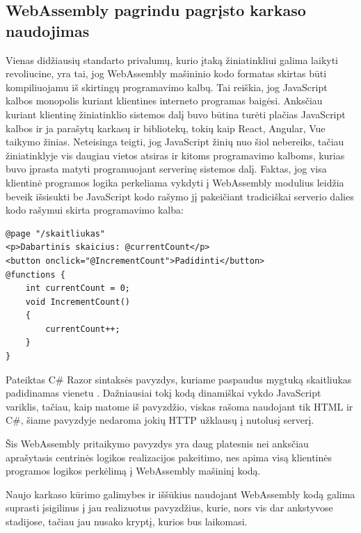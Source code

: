 \documentclass{VUMIFPSkursinis}
\begin{document}
\subsection{WebAssembly pagrindu pagrįsto karkaso naudojimas}
Vienas didžiausių standarto privalumų, kurio įtaką žiniatinkliui galima laikyti revoliucine, yra tai, jog WebAssembly mašininio kodo formatas skirtas būti kompiliuojamu iš skirtingų programavimo kalbų. Tai reiškia, jog JavaScript kalbos monopolis kuriant klientines interneto programas baigėsi. Anksčiau kuriant klientinę žiniatinklio sistemos dalį buvo būtina turėti plačias JavaScript kalbos ir ja parašytų karkasų ir bibliotekų, tokių kaip React, Angular, Vue taikymo žinias. Neteisinga teigti, jog JavaScript žinių nuo šiol nebereiks, tačiau žiniatinklyje vis daugiau vietos atsiras ir kitoms programavimo kalboms, kurias buvo įprasta matyti programuojant serverinę sistemos dalį. Faktas, jog visa klientinė programos logika perkeliama vykdyti į WebAssembly modulius leidžia beveik išsisukti be JavaScript kodo rašymo jį pakeičiant tradiciškai serverio dalies kodo rašymui skirta programavimo kalba:

\begin{center}
\begin{small}
\begin{verbatim}
@page "/skaitliukas"
<p>Dabartinis skaicius: @currentCount</p>
<button onclick="@IncrementCount">Padidinti</button>
@functions {
    int currentCount = 0;
    void IncrementCount()
    {
        currentCount++;
    }
}
\end{verbatim}
\end{small}
\end{center}Pateiktas C\# Razor sintaksės pavyzdys, kuriame paspaudus mygtuką skaitliukas padidinamas vienetu \cite{BLZ19}. Dažniausiai tokį kodą dinamiškai vykdo JavaScript variklis, tačiau, kaip matome iš pavyzdžio, viskas rašoma naudojant tik HTML ir C\#, šiame pavyzdyje nedaroma jokių HTTP užklausų į nutolusį serverį.

Šis WebAssembly pritaikymo pavyzdys yra daug platesnis nei anksčiau aprašytasis centrinės logikos realizacijos pakeitimo, nes apima visą klientinės programos logikos perkėlimą į WebAssembly mašininį kodą.

Naujo karkaso kūrimo galimybes ir iššūkius naudojant WebAssembly kodą galima suprasti įsigilinus į jau realizuotus pavyzdžius, kurie, nors vis dar ankstyvose stadijose, tačiau jau nusako kryptį, kurios bus laikomasi.
\end{document}
